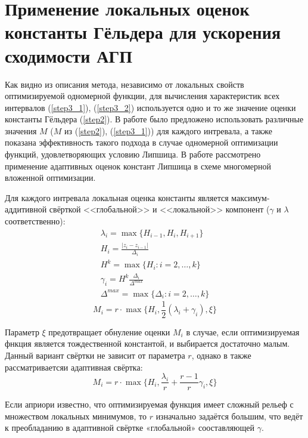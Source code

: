 \section{Применение локальных оценок константы Гёльдера для ускорения сходимости АГП}
Как видно из описания метода, независимо от локальных свойств оптимизируемой одномерной
функции, для вычисления характеристик всех интервалов (\ref{step3_1}), (\ref{step3_2}) используется одно и то же
значение оценки константы Гёльдера (\ref{step2}). В работе \cite{sergLocalTuningFirst} было предложено использовать различные
значения \(M\) (\(M\) из (\ref{step2}), (\ref{step3_1})) для каждого интревала, а
также показана эффективность такого подхода в случае одномерной оптимизации функций,
удовлетворяющих условию Липшица. В работе \cite{nestedLocal} рассмотрено применение
адаптивных оценок констант Липшица в схеме многомерной вложенной оптимизации.

Для каждого интревала локальная оценка константы является максимум-аддитивной свёрткой
<<глобальной>> и <<локальной>> компонент (\(\gamma\) и \(\lambda\) соответственно):
\begin{displaymath}
  \begin{array}{lr}
    \lambda_i=\max\{H_{i-1},H_i,H_{i+1}\} \\
    H_i=\frac{|z_i-z_{i-1}|}{\Delta_i} \\
    H^k=\max\{H_i:i=2,\dots ,k\} \\
    \gamma_i=H^k\frac{\Delta_i}{\Delta^{max}} \\
    \Delta^{max}=\max\{\Delta_{i}:i=2,\dots ,k\}
  \end{array}
\end{displaymath}
\begin{equation}
\label{additiveConv}
M_i=r\cdot \max\{H_i, \frac{1}{2}(\lambda_i+\gamma_i),\xi\}
\end{equation}

Параметр \(\xi\) предотвращает обнуление оценки \(M_i\) в случае, если оптимизируемая
фнкция является тождественной константой, и выбирается достаточно малым.
Данный вариант свёртки не зависит от параметра \(r\), однако в \cite{sergLocalTuning}
также рассматриваетсяи адаптивная свёртка:
\begin{equation}
\label{additiveAdaptiveConv}
M_i=r\cdot \max\{H_i, \frac{\lambda_i}{r}+\frac{r-1}{r}\gamma_i,\xi\}
\end{equation}

Если априори известно, что оптимизируемая функция имеет сложный рельеф с множеством
локальных минимумов, то \(r\) изначально задаётся большим, что ведёт к преобладанию в
адаптивной свёртке «глобальной» сооставляющей \(\gamma\).

